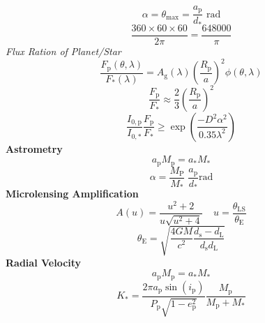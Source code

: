 \documentclass{article}
\begin{document}
\begin{equation}
\alpha = \theta_\mathrm{max} = \frac{a_\mathrm{p}}{d_\mathrm{*}} \text{ rad}
\end{equation}
\begin{equation}
\frac{360 \times 60 \times 60}{2 \pi} = \frac{648000}{\pi}
\end{equation}
\textit{Flux Ration of Planet/Star}
\begin{equation}
\frac{F_\mathrm{p}(\theta, \lambda)}{F_\mathrm{*}(\lambda)} = A_\mathrm{g}(\lambda) \left( \frac{R_\mathrm{p}}{a} \right)^2 \phi(\theta, \lambda)
\end{equation}
\begin{equation}
\frac{F_\mathrm{p}}{F_\mathrm{*}} \approx \frac{2}{3} \left( \frac{R_\mathrm{p}}{a} \right)^2
\end{equation}
\begin{equation}
\frac{I_\mathrm{0, p}}{I_\mathrm{0, *}} \frac{F_\mathrm{p}}{F_\mathrm{*}} \geq \exp \left( \frac{-D^2 \alpha^2}{0.35 \lambda^2} \right)
\end{equation}
\textbf{Astrometry}
\begin{equation}
a_\mathrm{p} M_\mathrm{p} = a_\mathrm{*} M_\mathrm{*}
\end{equation}
\begin{equation}
\alpha  = \frac{M_\mathrm{P}}{M_\mathrm{*}} \; \frac{a_\mathrm{p}}{d_\mathrm{*}} \mathrm{rad}
\end{equation}
\textbf{Microlensing Amplification}
\begin{equation}
A(u) = \frac{u^2 + 2}{u \sqrt{u^2 + 4}} \; \; \; \; u = \frac{\theta_\mathrm{LS}}{\theta_\mathrm{E}}
\end{equation}
\begin{equation}
\theta_\mathrm{E} = \sqrt{\frac{4GM}{c^2} \frac{d_\mathrm{s} - d_\mathrm{L}}{d_\mathrm{s} d_\mathrm{L}}}
\end{equation}
\textbf {Radial Velocity}
\begin{equation}
a_\mathrm{p} M_\mathrm{p} = a_\mathrm{*} M_\mathrm{*}
\end{equation}
\begin{equation}
K_\mathrm{*} = \frac {2 \pi a_\mathrm{p} \sin(i_\mathrm{p})} {P_\mathrm{p} \sqrt {1-e_\mathrm{p}^2}} \frac {M_\mathrm{p}} {M_\mathrm{p} + M_\mathrm{*}}
\end{equation}
\end{document}
